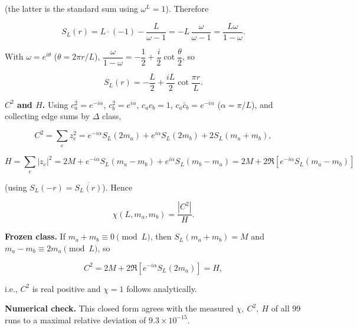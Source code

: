 \documentclass[
  a4paper,
]{article}
\begin{document}
(the latter is the standard sum using \(\omega^L=1\)). Therefore

\[
S_L(r)=L\cdot(-1)-\frac{L}{\omega-1}
=-L\,\frac{\omega}{\omega-1}
=\frac{L\omega}{1-\omega}.
\]

With \(\omega=e^{i\theta}\) (\(\theta=2\pi r/L\)),
\(\dfrac{\omega}{1-\omega}=-\dfrac12+\dfrac i2\cot\dfrac\theta2\), so

\[
S_L(r)=-\frac L2+\frac{iL}2\cot\frac{\pi r}{L}.
\]

\textbf{\(C^2\) and \(H\).} Using \(c_a^2=e^{-i\alpha}\),
\(c_b^2=e^{i\alpha}\), \(c_ac_b=1\), \(c_a\bar c_b=e^{-i\alpha}\)
(\(\alpha=\pi/L\)), and collecting edge sums by \(\Delta\) class,

\[
C^2=\sum_e z_e^2
=e^{-i\alpha}S_L(2m_a)+e^{i\alpha}S_L(2m_b)+2S_L(m_a+m_b),
\]

\[
H=\sum_e|z_e|^2
=2M+e^{-i\alpha}S_L(m_a-m_b)+e^{i\alpha}S_L(m_b-m_a)
=2M+2\Re\!\left[e^{-i\alpha}S_L(m_a-m_b)\right]
\]

(using \(S_L(-r)=\overline{S_L(r)}\)). Hence

\[
\chi(L,m_a,m_b)=\frac{|C^2|}{H}.
\]

\textbf{Frozen class.} If \(m_a+m_b\equiv0\pmod L\), then
\(S_L(m_a+m_b)=M\) and \(m_a-m_b\equiv2m_a\pmod L\), so

\[
C^2=2M+2\Re\!\left[e^{-i\alpha}S_L(2m_a)\right]=H,
\]

i.e., \(C^2\) is real positive and \(\chi=1\) follows analytically.

\textbf{Numerical check.} This closed form agrees with the measured
\(\chi,\ C^2,\ H\) of all 99 runs to a maximal relative deviation of
\(9.3\times10^{-15}\).
\end{document}
